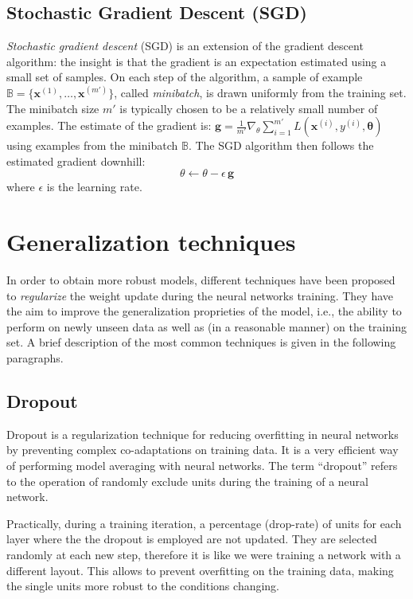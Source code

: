 \subsection{Stochastic Gradient Descent (SGD)}

\textit{Stochastic gradient descent} (SGD) is an extension of the gradient descent algorithm: the insight is that the gradient is an expectation estimated using a small set of samples.
On each step of the algorithm, a sample of example $\mathbb{B} = \{ \textbf{x}^{(1)}, \ldots, \textbf{x}^{(m')}\}$, called \textit{minibatch}, is drawn uniformly from the training set.
The minibatch size $m'$ is typically chosen to be a relatively small number of examples.
The estimate of the gradient is:
$\textbf{g} = \frac{1}{m'} \nabla_{\theta} \sum\limits_{i=1}^{m'} L(\textbf{x}^{(i)}, y^{(i)}, \mathbf{\theta})$
using examples from the minibatch $\mathbb{B}$.
The SGD algorithm then follows the estimated gradient downhill:
\begin{equation}
\theta \leftarrow \theta - \epsilon\,\textbf{g}
\end{equation}
where $\epsilon$ is the learning rate.


\section{Generalization techniques}

In order to obtain more robust models, different techniques have been proposed to \textit{regularize} the weight update during the neural networks training. They have the aim to improve the generalization proprieties of the model, i.e., the ability to perform on newly unseen data as well as (in a reasonable manner) on the training set. A brief description of the most common techniques is given in the following paragraphs.

\subsection{Dropout}

Dropout \cite{srivastava2014dropout} is a regularization technique for reducing overfitting in neural networks by preventing complex co-adaptations on training data. It is a very efficient way of performing model averaging with neural networks. The term ``dropout'' refers to the operation of randomly exclude units during the training of a neural network.

Practically, during a training iteration, a percentage (drop-rate) of units for each layer where the the dropout is employed are not updated. They are selected randomly at each new step, therefore it is like we were training a network with a different layout. This allows to prevent overfitting on the training data, making  the single units more robust to the conditions changing.
 

